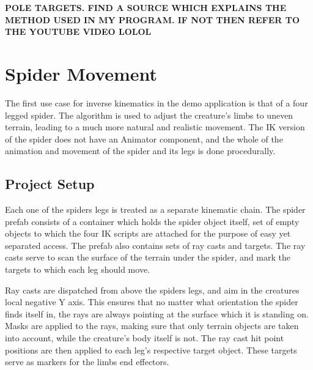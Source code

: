 


\textbf{POLE TARGETS. FIND A SOURCE WHICH EXPLAINS THE METHOD USED IN MY
PROGRAM. IF NOT THEN REFER TO THE YOUTUBE VIDEO LOLOL}


\section{Spider Movement}
The first use case for inverse kinematics in the demo application is that of
a four legged spider. The algorithm is used to adjust the creature's limbs to
uneven terrain, leading to a much more natural and realistic movement. The IK
version of the spider does not have an Animator component, and the whole of the
animation and movement of the spider and its legs is done procedurally.
\subsection{Project Setup}
Each one of the spiders legs is treated as a separate kinematic chain. The
spider prefab consists of a container which holds the spider object itself, set
of empty objects to which the four IK scripts are attached for the purpose of
easy yet separated access. The prefab also contains sets of ray casts and
targets. The ray casts serve to scan the surface of the terrain under the
spider, and mark the targets to which each leg should move.

Ray casts are dispatched from above the spiders legs, and aim in the creatures
local negative Y axis. This ensures that no matter what orientation the spider
finds itself in, the rays are always pointing at the surface which it is
standing on. Masks are applied to the rays, making sure that only terrain
objects are taken into account, while the creature's body itself is not. The ray
cast hit point positions are then applied to each leg's respective target
object. These targets serve as markers for the limbs end effectors. 

